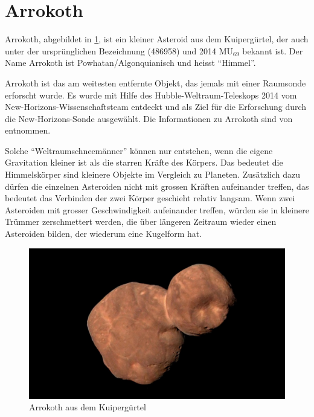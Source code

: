 %
%
%
%
\section{Arrokoth
\label{planet:section:arrokoth}}
Arrokoth, abgebildet in \cref{planet:fig:arrokoth}, ist ein kleiner Asteroid aus dem Kuipergürtel, der auch unter der ursprünglichen Bezeichnung (486958) und 2014 \(\text{MU}_{69}\) bekannt ist.
%
%
Der Name Arrokoth ist Powhatan/Algonquianisch und heisst ``Himmel''.

Arrokoth ist das am weitesten entfernte Objekt, das jemals mit einer Raumsonde erforscht wurde.
Es wurde mit Hilfe des Hubble-Weltraum-Teleskops 2014 vom New-Ho\-ri\-zons-Wissenschaftsteam entdeckt und als Ziel für die Erforschung durch die New-Ho\-ri\-zons-Sonde ausgewählt.
%
Die Informationen zu Arrokoth sind von \cite{planet:arrokoth} entnommen.

Solche ``Weltraumschneemänner'' können nur entstehen, wenn die eigene Gravitation kleiner ist als die starren Kräfte des Körpers.
%
Das bedeutet die Himmelskörper sind kleinere Objekte im Vergleich zu Planeten.
Zusätzlich dazu dürfen die einzelnen Asteroiden nicht mit grossen
Kräften aufeinander treffen, das bedeutet das Verbinden der zwei
Körper geschieht relativ langsam.
Wenn zwei Asteroiden mit grosser Geschwindigkeit aufeinander treffen, würden sie in kleinere Trümmer zerschmettert werden, die über längeren Zeitraum wieder einen Asteroiden bilden, der wiederum eine Kugelform hat.
\begin{figure}
    \centering
    \includegraphics[width=\linewidth]{papers/planet/pictures/Arrokoth.pdf}
    \caption{Arrokoth aus dem Kuipergürtel \cite{planet:arrokothpic}
        \label{planet:fig:arrokoth}}
\end{figure}
